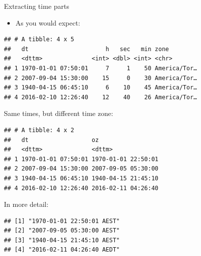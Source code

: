 \documentclass[
  ignorenonframetext,
]{beamer}
\newenvironment{Shaded}{\begin{snugshade}}{\end{snugshade}}
\newcommand{\DataTypeTok}[1]{\textcolor[rgb]{0.13,0.29,0.53}{#1}}
\newcommand{\KeywordTok}[1]{\textcolor[rgb]{0.13,0.29,0.53}{\textbf{#1}}}
\newcommand{\NormalTok}[1]{#1}
\newcommand{\OperatorTok}[1]{\textcolor[rgb]{0.81,0.36,0.00}{\textbf{#1}}}
\newcommand{\StringTok}[1]{\textcolor[rgb]{0.31,0.60,0.02}{#1}}
\providecommand{\tightlist}{%
  \setlength{\itemsep}{0pt}\setlength{\parskip}{0pt}}
\begin{document}
\begin{frame}[fragile]{Extracting time parts}
\protect\hypertarget{extracting-time-parts}{}

\begin{itemize}
\tightlist
\item
  As you would expect:
\end{itemize}

\begin{Shaded}
\end{Shaded}

\begin{verbatim}
## # A tibble: 4 x 5
##   dt                      h   sec   min zone        
##   <dttm>              <int> <dbl> <int> <chr>       
## 1 1970-01-01 07:50:01     7     1    50 America/Tor…
## 2 2007-09-04 15:30:00    15     0    30 America/Tor…
## 3 1940-04-15 06:45:10     6    10    45 America/Tor…
## 4 2016-02-10 12:26:40    12    40    26 America/Tor…
\end{verbatim}

\end{frame}

\begin{frame}[fragile]{Same times, but different time zone:}
\protect\hypertarget{same-times-but-different-time-zone}{}

\begin{Shaded}
\end{Shaded}

\begin{verbatim}
## # A tibble: 4 x 2
##   dt                  oz                 
##   <dttm>              <dttm>             
## 1 1970-01-01 07:50:01 1970-01-01 22:50:01
## 2 2007-09-04 15:30:00 2007-09-05 05:30:00
## 3 1940-04-15 06:45:10 1940-04-15 21:45:10
## 4 2016-02-10 12:26:40 2016-02-11 04:26:40
\end{verbatim}

In more detail:

\begin{verbatim}
## [1] "1970-01-01 22:50:01 AEST"
## [2] "2007-09-05 05:30:00 AEST"
## [3] "1940-04-15 21:45:10 AEST"
## [4] "2016-02-11 04:26:40 AEDT"
\end{verbatim}

\end{frame}
\end{document}
